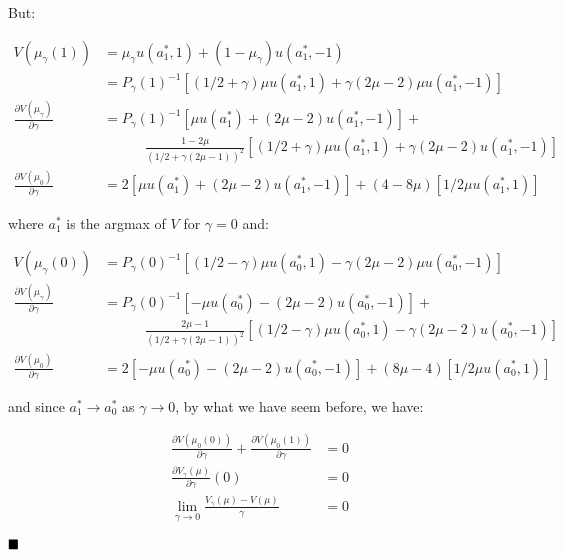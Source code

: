 \documentclass{article}
\begin{document}
But:

\[
\begin{split}
  V(\mu_\gamma(1)) & = \mu_\gamma u(a_1^*, 1) + (1 - \mu_\gamma) u(a_1^*, -1) \\
  & = P_\gamma(1)^{-1} 
    [(1/2 + \gamma)\mu u(a_1^*, 1) + \gamma(2\mu - 2)\mu u(a_1^*, -1)] \\
  \frac{\partial V(\mu_\gamma)}{\partial \gamma} & = P_\gamma(1)^{-1} 
    [\mu u(a_1^*) + (2\mu - 2)u(a_1^*, -1)] + \\
    & \qquad\quad
    \frac{1 - 2\mu}{(1/2 + \gamma(2\mu -1))^2} 
    [(1/2 + \gamma)\mu u(a_1^*,1) + \gamma(2\mu - 2) u(a_1^*, -1)] \\
  \frac{\partial V(\mu_0)}{\partial \gamma} & = 
    2[\mu u(a_1^*) + (2\mu - 2)u(a_1^*, -1)] +
    (4 - 8\mu)[1/2\mu u(a_1^*,1)]
\end{split}
\]

where $a_1^*$ is the argmax of $V$ for $\gamma = 0$ and:

\[
\begin{split}
  V(\mu_\gamma(0)) & =  P_\gamma(0)^{-1} 
    [(1/2 - \gamma)\mu u(a_0^*, 1) - \gamma(2\mu - 2)\mu u(a_0^*, -1)] \\
  \frac{\partial V(\mu_\gamma)}{\partial \gamma} & = P_\gamma(0)^{-1} 
    [-\mu u(a_0^*) - (2\mu - 2)u(a_0^*, -1)] + \\
    & \qquad\quad
    \frac{2\mu - 1}{(1/2 + \gamma(2\mu -1))^2}
    [(1/2 - \gamma)\mu u(a_0^*,1) - \gamma(2\mu - 2) u(a_0^*, -1)] \\
  \frac{\partial V(\mu_0)}{\partial \gamma} & = 
    2[-\mu u(a_0^*) - (2\mu - 2)u(a_0^*, -1)] +
    (8\mu - 4)[1/2\mu u(a_0^*,1)]
\end{split}
\]

and since $a_1^* \to a_0^*$ as $\gamma \to 0$, by what we have seem before,
we have:

\[
\begin{split}
  \frac{\partial V(\mu_0(0))}{\partial \gamma} +
    \frac{\partial V(\mu_0(1))}{\partial \gamma} & = 0 \\
  \frac{\partial V_\gamma(\mu)}{\partial \gamma}(0) & = 0 \\
  \lim_{\gamma \to 0} \frac{V_\gamma(\mu) - V(\mu)}{\gamma} & = 0
\end{split}
\]

$\hfill\blacksquare$ 





\end{document}

